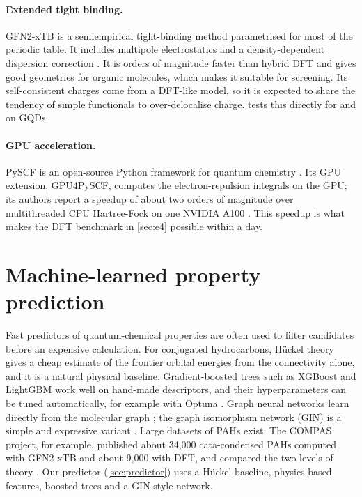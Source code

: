 \paragraph{Extended tight binding.}
GFN2-xTB is a semiempirical tight-binding method parametrised for most of the periodic table. It
includes multipole electrostatics and a density-dependent dispersion correction
\cite{bannwarth2019gfn2,bannwarth2021xtb}. It is orders of magnitude faster than hybrid DFT and
gives good geometries for organic molecules, which makes it suitable for screening. Its
self-consistent charges come from a DFT-like model, so it is expected to share the tendency of
simple functionals to over-delocalise charge.  tests this directly for
 and  on GQDs.

\paragraph{GPU acceleration.}
PySCF is an open-source Python framework for quantum chemistry
\cite{sun2018pyscf,sun2020pyscf}. Its GPU extension, GPU4PySCF, computes the electron-repulsion
integrals on the GPU; its authors report a speedup of about two orders of magnitude over
multithreaded CPU Hartree-Fock on one NVIDIA A100 \cite{li2025gpu4pyscf}. This speedup is what makes
the DFT benchmark in \cref{sec:e4} possible within a day.

\section{Machine-learned property prediction}
\label{sec:lit-ml}

Fast predictors of quantum-chemical properties are often used to filter candidates before an
expensive calculation. For conjugated hydrocarbons, H\"uckel theory \cite{huckel1931} gives a
cheap estimate of the frontier orbital energies from the connectivity alone, and it is a natural
physical baseline. Gradient-boosted trees such as XGBoost and LightGBM \cite{chen2016xgboost,ke2017lightgbm}
work well on hand-made descriptors, and their hyperparameters can be tuned automatically, for
example with Optuna \cite{akiba2019optuna}. Graph neural networks learn directly from the molecular
graph \cite{gilmer2017mpnn}; the graph isomorphism network (GIN) is a simple and expressive variant
\cite{xu2019gin}. Large datasets of PAHs exist. The COMPAS project, for example, published about
34{,}000 cata-condensed PAHs computed with GFN2-xTB and about 9{,}000 with DFT, and compared the two
levels of theory \cite{wahab2022compas}. Our predictor (\cref{sec:predictor}) uses a H\"uckel
baseline, physics-based features, boosted trees and a GIN-style network.

